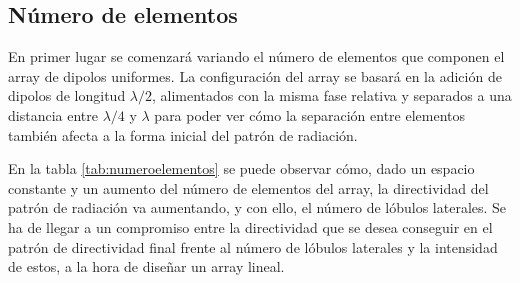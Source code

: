 \subsection{Número de elementos}
\par En primer lugar se comenzará variando el número de elementos que componen el array de dipolos uniformes. La configuración del array se basará en la adición de dipolos de longitud $\lambda/2$, alimentados con la misma fase relativa y separados a una distancia entre $\lambda/4$ y $\lambda$ para poder ver cómo la separación entre elementos también afecta a la forma inicial del patrón de radiación.
\\
\par En la tabla \ref{tab:numeroelementos} se puede observar cómo, dado un espacio constante y un aumento del número de elementos del array, la directividad del patrón de radiación va aumentando, y con ello, el número de lóbulos laterales. Se ha de llegar a un compromiso entre la directividad que se desea conseguir en el patrón de directividad final frente al número de lóbulos laterales y la intensidad de estos, a la hora de diseñar un array lineal.


